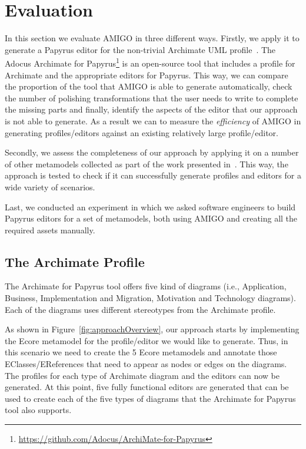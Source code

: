 \section{Evaluation}
\label{sec:evaluation}

In this section we evaluate AMIGO in three different ways. 
Firstly, we apply it to generate a Papyrus editor for the non-trivial Archimate 
UML profile~\cite{iacob2009archimate,haren2012archimate}. The Adocus Archimate 
for Papyrus\footnote{\url{https://github.com/Adocus/ArchiMate-for-Papyrus}} is 
an open-source tool that includes a profile for Archimate and the appropriate 
editors for Papyrus. This way, we can compare the proportion of the tool that 
AMIGO is able to generate automatically, check the number of polishing 
transformations that the user needs to write to complete the missing parts and 
finally, identify the aspects of the editor that our approach is not able to 
generate. As a result we can to measure the \textit{efficiency} of AMIGO in
generating profiles/editors against an existing relatively large 
profile/editor. 

Secondly, we assess the completeness of our approach by applying it on a number 
of other metamodels collected as part of the work presented 
in~\cite{williams2013metamodels}. This way, the approach is tested to check if 
it can successfully generate profiles and editors for a wide variety of 
scenarios.

Last, we conducted an experiment in which we asked software engineers to build Papyrus
editors for a set of metamodels, both using AMIGO and creating all the required assets
manually.

\subsection{The Archimate Profile}
\label{sec:efficiencyEvaluation}
The Archimate for Papyrus tool offers five kind of diagrams (i.e., Application,
Business, Implementation and Migration, Motivation and Technology diagrams). Each
of the diagrams uses different stereotypes from the Archimate profile. 

As shown in Figure~\ref{fig:approachOverview}, our approach starts by 
implementing the Ecore metamodel for the profile/editor we would like to 
generate. Thus, in this scenario we need to create the 5 Ecore metamodels and 
annotate those EClasses/EReferences that need to appear as nodes or edges on 
the diagrams. The profiles for each type of Archimate diagram and the editors 
can now be generated. At this point, five fully functional editors are 
generated that can be used to create each of the five types of diagrams that 
the Archimate for Papyrus tool also supports. 

